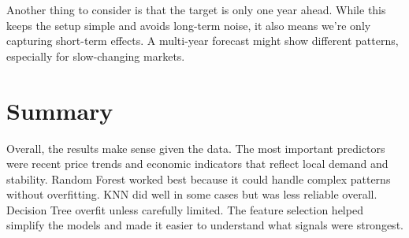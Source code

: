 Another thing to consider is that the target is only one year ahead. While this keeps the setup simple and avoids long-term noise, it also means we’re only capturing short-term effects. A multi-year forecast might show different patterns, especially for slow-changing markets.

\section{Summary}

Overall, the results make sense given the data. The most important predictors were recent price trends and economic indicators that reflect local demand and stability. Random Forest worked best because it could handle complex patterns without overfitting. KNN did well in some cases but was less reliable overall. Decision Tree overfit unless carefully limited. The feature selection helped simplify the models and made it easier to understand what signals were strongest.

